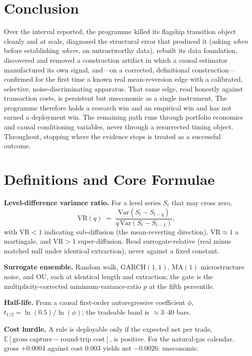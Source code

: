 \documentclass[11pt,a4paper]{article}
\newcommand{\VR}{\mathrm{VR}}
\newcommand{\half}{t_{1/2}}
\begin{document}
\section{Conclusion}

Over the interval reported, the programme killed its flagship transition object cleanly and at scale,
diagnosed the structural error that produced it (asking \emph{when} before establishing \emph{where},
on untrustworthy data), rebuilt its data foundation, discovered and removed a construction artifact in
which a causal estimator manufactured its own signal, and---on a corrected, definitional
construction---confirmed for the first time a known real mean-reversion edge with a calibrated,
selective, noise-discriminating apparatus. That same edge, read honestly against transaction costs, is
persistent but uneconomic as a single instrument. The programme therefore holds a research win and an
empirical win and has not earned a deployment win. The remaining path runs through portfolio economics
and causal conditioning variables, never through a resurrected timing object. Throughout, stopping
where the evidence stops is treated as a successful outcome.

\appendix
\section{Definitions and Core Formulae}

\textbf{Level-difference variance ratio.} For a level series $S_t$ that may cross zero,
\[
\VR(q) \;=\; \frac{\mathrm{Var}(S_t - S_{t-q})}{q\,\mathrm{Var}(S_t - S_{t-1})},
\]
with $\VR<1$ indicating sub-diffusion (the mean-reverting direction), $\VR\approx 1$ a martingale, and
$\VR>1$ super-diffusion. Read surrogate-relative (real minus matched null under identical extraction),
never against a fixed constant.

\textbf{Surrogate ensemble.} Random walk, GARCH$(1,1)$, $\mathrm{MA}(1)$ microstructure noise, and OU,
each at identical length and extraction; the gate is the multiplicity-corrected minimum-variance-ratio
$p$ at the fifth percentile.

\textbf{Half-life.} From a causal first-order autoregressive coefficient $\phi$,
$\half = \ln(0.5)/\ln(\phi)$; the tradeable band is $\approx 3$--$40$ bars.

\textbf{Cost hurdle.} A rule is deployable only if the expected net per trade,
$\mathbb{E}[\text{gross capture} - \text{round-trip cost}]$, is positive. For the natural-gas calendar,
gross $+0.0004$ against cost $0.003$ yields net $-0.0026$: uneconomic.
\end{document}
